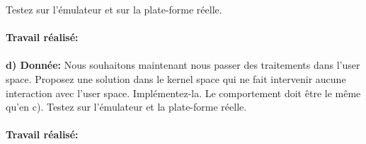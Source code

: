 Testez sur l’émulateur et sur la plate-forme réelle.\\\\
\textbf{Travail réalisé: }\\\\
\textbf{d) Donnée: }Nous souhaitons maintenant nous passer des traitements dans l’user space. Proposez une solution
dans le kernel space qui ne fait intervenir aucune interaction avec l’user space. Implémentez-la.
Le comportement doit être le même qu’en c). Testez sur l’émulateur et la plate-forme réelle.\\\\
\textbf{Travail réalisé: }\\\\